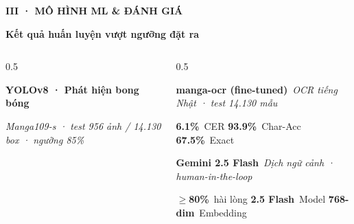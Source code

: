 \documentclass[aspectratio=169,10pt]{beamer}
\newcommand{\kick}[1]{{\headfont\bfseries\footnotesize\textcolor{mred}{\MakeUppercase{#1}}}}
\newcommand{\slidehead}[2]{%
  \kick{#1}\par\vspace{0.6mm}%
  {\headfont\bfseries\LARGE\textcolor{ink}{#2}}\par\vspace{1.2mm}}
\begin{document}
\begin{frame}
\slidehead{III · Mô hình ML \& đánh giá}{Kết quả huấn luyện vượt ngưỡng đặt ra}
\vspace{0.5mm}
\begin{columns}[t]
\begin{column}{0.5\textwidth}
\begin{tcolorbox}[card,height=4.9cm]
{\headfont\bfseries YOLOv8 · Phát hiện bong bóng}\par
{\footnotesize\itshape\textcolor{slate}{Manga109-s · test 956 ảnh / 14.130 box · ngưỡng 85\%}}\par\vspace{2mm}
\centering
{}
\end{tcolorbox}
\end{column}
\begin{column}{0.5\textwidth}
\begin{tcolorbox}[card,height=2.35cm]
{\headfont\bfseries manga-ocr (fine-tuned)}\ {\footnotesize\itshape\textcolor{slate}{OCR tiếng Nhật · test 14.130 mẫu}}\par\vspace{2mm}
{\headfont\bfseries\Large\color{ink}6.1\%}\ {\footnotesize\textcolor{slate}{CER}}\hfill
{\headfont\bfseries\Large\color{ink}93.9\%}\ {\footnotesize\textcolor{slate}{Char-Acc}}\hfill
{\headfont\bfseries\Large\color{ink}67.5\%}\ {\footnotesize\textcolor{slate}{Exact}}
\end{tcolorbox}
\vspace{1.5mm}
\begin{tcolorbox}[creamcard,height=2.35cm]
{\headfont\bfseries Gemini 2.5 Flash}\ {\footnotesize\itshape\textcolor{slate}{Dịch ngữ cảnh · human-in-the-loop}}\par\vspace{2mm}
{\headfont\bfseries\Large\color{mgreen}$\geq$80\%}\ {\footnotesize\textcolor{slate}{hài lòng}}\hfill
{\headfont\bfseries\Large\color{mgreen}2.5 Flash}\ {\footnotesize\textcolor{slate}{Model}}\hfill
{\headfont\bfseries\Large\color{mgreen}768-dim}\ {\footnotesize\textcolor{slate}{Embedding}}
\end{tcolorbox}
\end{column}
\end{columns}
\end{frame}
\end{document}
